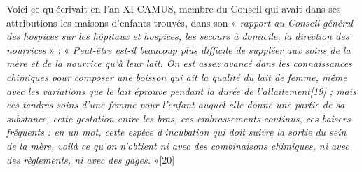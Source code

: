  Voici ce qu'écrivait en l'an XI CAMUS, membre du Conseil qui avait dans ses attributions les maisons d'enfants trouvés, dans son « \emph{rapport au Conseil général des hospices sur les hôpitaux et hospices, les secours à domicile, la direction des nourrices} » : « \emph{Peut-être est-il beaucoup plus difficile de suppléer aux soins de la mère et de la nourrice qu'à leur lait. On est assez avancé dans les connaissances chimiques pour composer une boisson qui ait la qualité du lait de femme, même avec les variations que le lait éprouve pendant la durée de l'allaitement[19] ; mais ces tendres soins d'une femme pour l'enfant auquel elle donne une partie de sa substance, cette gestation entre les bras, ces embrassements continus, ces baisers fréquents : en un mot, cette espèce d'incubation qui doit suivre la sortie du sein de la mère, voilà ce qu'on n'obtient ni avec des combinaisons chimiques, ni avec des règlements, ni avec des gages.} »[20] 
 
